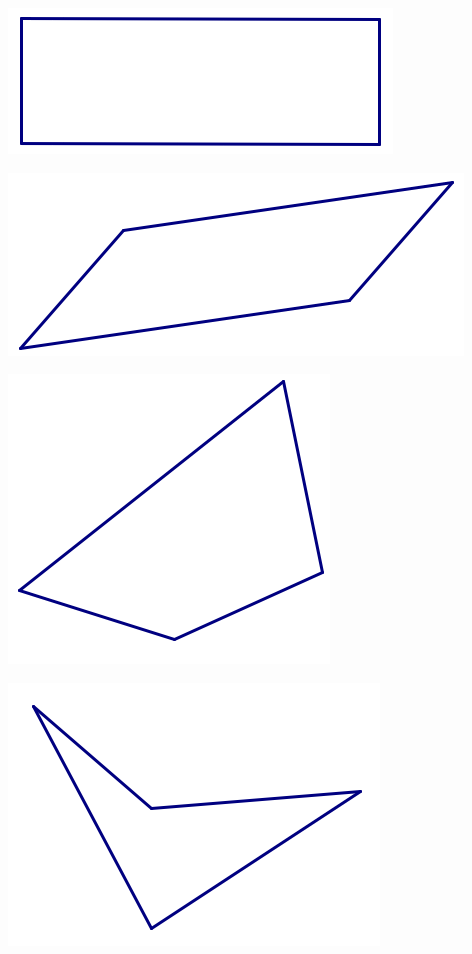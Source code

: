 \begin{center}
\includegraphics[scale=0.85]{rect2}

\includegraphics[scale=0.75]{quad3}


\includegraphics[scale=0.75]{quad1}

\includegraphics[scale=0.75]{quad2}




\end{center}
